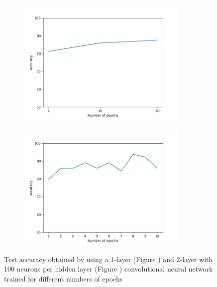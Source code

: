 \documentclass[12pt]{article}
\begin{document}
\begin{figure}[h!]
		\begin{subfigure}{0.6\textwidth}
		\includegraphics[width = 0.9\textwidth]{ex3_CNN1l_accuracy-epochs.png}
		\caption{}
		\label{subfig:CNN1l_accuracy-epochs}
	\end{subfigure}
	\begin{subfigure}{0.6\textwidth}
		\includegraphics[width = 0.9\textwidth]{ex3_CNN2l_accuracy-epochs.png}
		\caption{}
		\label{subfig:CNN2l_accuracy-epochs}
	\end{subfigure}
	\caption{Test accuracy obtained by using a 1-layer (Figure ) and 2-layer with 100 neurons per hidden layer (Figure ) convolutional neural network trained for different numbers of epochs}
	\label{fig:ex3_CNN_epochs}
\end{figure}
\end{document}
